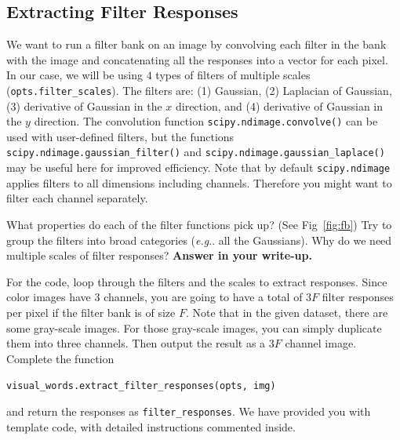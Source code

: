 \documentclass[10pt]{article}
\makeatletter
\DeclareRobustCommand\onedot{\futurelet\@let@token\@onedot}
\def\@onedot{\ifx\@let@token.\else.\null\fi\xspace}
\def\eg{\emph{e.g}\onedot} \def\Eg{\emph{E.g}\onedot}
\def\ie{\emph{i.e}\onedot} \def\Ie{\emph{I.e}\onedot}
\makeatother
\begin{document}


\subsection{Extracting Filter Responses}

We want to run a filter bank on an image by convolving each filter in the bank with the image and concatenating all the responses into a vector for each pixel.
In our case, we will be using $4$ types of filters of multiple scales ({\tt opts.filter\_scales}).
The filters are: (1) Gaussian, (2) Laplacian of Gaussian, (3) derivative of Gaussian in the $x$ direction, and (4) derivative of Gaussian in the $y$ direction.
The convolution function {\tt scipy.ndimage.convolve()} can be used with user-defined filters, but the functions {\tt scipy.ndimage.gaussian\_filter()} and {\tt scipy.ndimage.gaussian\_laplace()} may be useful here for improved efficiency. Note that by default {\tt scipy.ndimage} applies filters to all dimensions including channels. Therefore you might want to filter each channel separately.
\par {}
What properties do each of the filter functions pick up? (See Fig~\ref{fig:fb}) 
Try to group the filters into broad categories (\eg all the Gaussians). Why do we need multiple scales of filter responses? {\bf Answer in your write-up.}
\par {} 
For the code, loop through the filters and the scales to extract responses. Since color images have $3$ channels, you are going to have a total of $3F$ filter responses per pixel if the filter bank is of size $F$. Note that in the given dataset, there are some gray-scale images. For those gray-scale images, you can simply duplicate them into three channels. Then output the result as a $3F$ channel image. Complete the function 
\begin{center}
    {\tt visual\_words.extract\_filter\_responses(opts, img)}
\end{center}
and return the responses as {\tt filter\_responses}.
We have provided you with template code, with detailed instructions commented inside. %
\end{document}
